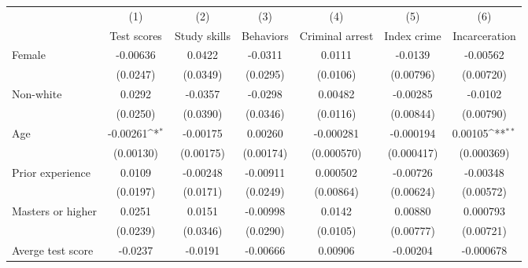 {
\def\sym#1{\ifmmode^{#1}\else\(^{#1}\)\fi}
\begin{tabular}{l*{6}{c}}
\hline\hline
            &\multicolumn{1}{c}{(1)}&\multicolumn{1}{c}{(2)}&\multicolumn{1}{c}{(3)}&\multicolumn{1}{c}{(4)}&\multicolumn{1}{c}{(5)}&\multicolumn{1}{c}{(6)}\\
            &\multicolumn{1}{c}{Test scores}&\multicolumn{1}{c}{Study skills}&\multicolumn{1}{c}{Behaviors}&\multicolumn{1}{c}{Criminal arrest}&\multicolumn{1}{c}{Index crime}&\multicolumn{1}{c}{Incarceration}\\
\hline
Female      &    -0.00636         &      0.0422         &     -0.0311         &      0.0111         &     -0.0139         &    -0.00562         \\
            &    (0.0247)         &    (0.0349)         &    (0.0295)         &    (0.0106)         &   (0.00796)         &   (0.00720)         \\
[1em]
Non-white   &      0.0292         &     -0.0357         &     -0.0298         &     0.00482         &    -0.00285         &     -0.0102         \\
            &    (0.0250)         &    (0.0390)         &    (0.0346)         &    (0.0116)         &   (0.00844)         &   (0.00790)         \\
[1em]
Age         &    -0.00261\sym{*}  &    -0.00175         &     0.00260         &   -0.000281         &   -0.000194         &     0.00105\sym{**} \\
            &   (0.00130)         &   (0.00175)         &   (0.00174)         &  (0.000570)         &  (0.000417)         &  (0.000369)         \\
[1em]
Prior experience&      0.0109         &    -0.00248         &    -0.00911         &    0.000502         &    -0.00726         &    -0.00348         \\
            &    (0.0197)         &    (0.0171)         &    (0.0249)         &   (0.00864)         &   (0.00624)         &   (0.00572)         \\
[1em]
Masters or higher&      0.0251         &      0.0151         &    -0.00998         &      0.0142         &     0.00880         &    0.000793         \\
            &    (0.0239)         &    (0.0346)         &    (0.0290)         &    (0.0105)         &   (0.00777)         &   (0.00721)         \\
[1em]
Averge test score&     -0.0237         &     -0.0191         &    -0.00666         &     0.00906         &    -0.00204         &   -0.000678         \\

\end{tabular}}
